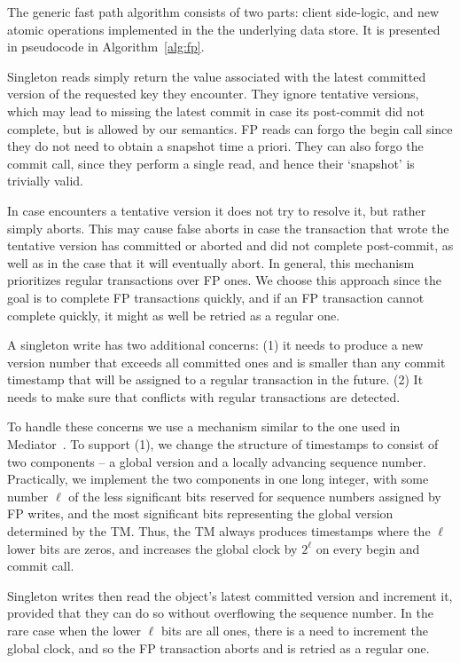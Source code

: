 The generic fast  path algorithm consists of two parts: 
client side-logic, and new atomic operations implemented in the the underlying data store.
It is presented in pseudocode in Algorithm~\ref{alg:fp}. 

Singleton reads simply return the value associated with the  latest committed version of the requested key they encounter.  
They ignore tentative versions, which may lead to missing the latest commit in case its post-commit did not complete, 
but is allowed by our semantics. 
FP reads can forgo the begin call since they do not need to obtain a snapshot time a priori. 
They can also forgo the commit call, since they perform a single read, and hence their `snapshot' is trivially valid.

In case   encounters a tentative version it does not try to resolve it, but rather simply aborts.
This may cause false aborts in case the transaction that wrote the tentative version has committed or aborted and did not 
complete post-commit, as well as in the case that it will eventually abort. 
In general, this mechanism prioritizes regular transactions over FP ones. We choose this approach since
the goal is to complete FP transactions quickly, and if an FP transaction cannot complete quickly, it might as well be 
retried as a regular one.
   
A singleton write has two additional concerns: (1) it needs to  produce a new version number that exceeds all committed ones and
is smaller than any commit timestamp that will be assigned to a regular transaction in the future.
(2)  It needs to make sure that conflicts with regular transactions are detected. 

To handle these concerns we use a mechanism similar to the one used in Mediator~\cite{mediator}.
To support (1), we change the structure of timestamps to consist of two 
components -- a global version and a locally advancing sequence number.
Practically, we implement the two components in one long integer, with some number $\ell$ of the less significant bits
reserved for sequence numbers assigned by FP writes, and the most significant bits representing 
the global version determined by the TM. Thus, the TM always produces timestamps where the $\ell$ lower bits are zeros,
and increases the global clock by $2^\ell$ on every begin and commit call.  

Singleton writes then read the object's latest committed version and increment it, provided that they can do so 
 without overflowing the sequence number. 
In the rare case when the lower $\ell$ bits are all ones, there is a need to increment the global clock, and so the FP transaction aborts and is retried
as a regular one. 

